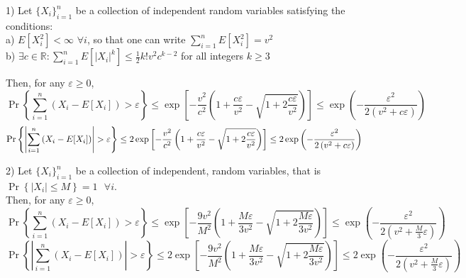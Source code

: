 \documentclass[12pt]{article}
\begin{document}
1) Let $\{X_{i}\}_{i=1}^{n}$ be a collection of independent random
variables satisfying the conditions: \\
a) $E[X_{i}^{2}]<\infty$ $\forall i$, so that one can write $\sum_{i=1}^{n}E[X_{i}^{2}]=v^2$\\
b) $\exists c\in\mathbb{R}:\sum_{i=1}^{n}E[\left\vert X_{i}\right\vert ^{k}]\leq 
\frac{1}{2}k!v^2c^{k-2}$ for all integers $k\geq 3$

Then, for any $\varepsilon \geq 0$,
\[
\Pr\left\{ \sum_{i=1}^{n}\left( X_{i}-E[X_{i}]\right) >\varepsilon \right\}
\leq \exp \left[-\frac{v^2}{c^{2}}\left( 1+\frac{c\varepsilon }{v^2}-\sqrt{1+2%
\frac{c\varepsilon }{v^2}}\right) \right] \leq \exp \left( -\frac{\varepsilon
^{2}}{2\left( v^2+c\varepsilon \right) }\right) 
\]
\[
\Pr\left\{ \left\vert \sum_{i=1}^{n}\left( X_{i}-E[X_{i}]\right) \right\vert
>\varepsilon \right\} \leq 2\exp \left[-\frac{v^2}{c^{2}}\left( 1+\frac{%
c\varepsilon }{v^2}-\sqrt{1+2\frac{c\varepsilon }{v^2}}\right) \right] \leq
2\exp \left( -\frac{\varepsilon ^{2}}{2\left( v^2+c\varepsilon \right) }%
\right) 
\]

2) Let $\{X_{i}\}_{i=1}^{n}$ be a collection of independent,  random variables, that is $\Pr\left\{\left\vert X_{i}\right\vert \leq M\right\} =1\text{ \ }\forall i$. \\
Then, for any $\varepsilon \geq 0$,
\[
\Pr\left\{ \sum_{i=1}^{n}\left( X_{i}-E[X_{i}]\right) >\varepsilon \right\}
\leq \exp \left[-\frac{9v^2}{M^{2}}\left( 1+\frac{M\varepsilon }{3v^2}-\sqrt{1+2
\frac{M\varepsilon }{3v^2}}\right) \right] \leq \exp \left( -\frac{\varepsilon
^{2}}{2\left( v^2+\frac{M}{3}\varepsilon \right) }\right) 
\]
\[
\Pr\left\{ \left\vert \sum_{i=1}^{n}\left( X_{i}-E[X_{i}]\right) \right\vert
>\varepsilon \right\} \leq 2\exp \left[-\frac{9v^2}{M^{2}}\left( 1+\frac{
M\varepsilon }{3v^2}-\sqrt{1+2\frac{M\varepsilon }{3v^2}}\right) \right] \leq
2\exp \left( -\frac{\varepsilon ^{2}}{2\left( v^2+\frac{M}{3}\varepsilon
\right) }\right) 
\]
\end{document}
